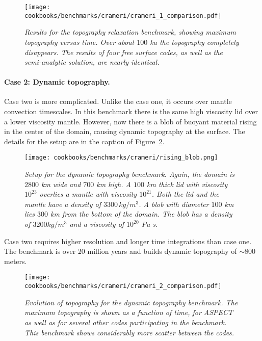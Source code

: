 \documentclass{article}
\newcommand{\aspect}{\textsc{ASPECT}}
\begin{document}
\begin{figure}
  \begin{center}
    \texttt{[image: cookbooks/benchmarks/crameri/crameri\_1\_comparison.pdf]}
  \end{center}
  \caption{\it Results for the topography relaxation benchmark, showing maximum topography 
   versus time. Over about $100$ ka the topography completely disappears. The results of four 
   free surface codes, as well as the semi-analytic solution, are nearly identical.}
  \label{fig:crameri-benchmark-relaxation-topography}
\end{figure}

\paragraph{Case 2: Dynamic topography.}
\label{sec:benchmark-crameri-case-2}

Case two is more complicated. Unlike the case one, it occurs over mantle convection 
timescales.  In this benchmark there is the same high viscosity lid over a lower 
viscosity mantle. However, now there is a blob of buoyant material rising in the 
center of the domain, causing dynamic topography at the surface. The details for the setup
are in the caption of Figure~\ref{fig:crameri-benchmark-rising-blob}.

\begin{figure}
  \begin{center}
    \texttt{[image: cookbooks/benchmarks/crameri/rising\_blob.png]}
  \end{center}
  \caption{\it Setup for the dynamic topography benchmark. Again, the domain is $2800$ km 
  wide and $700$ km high.  A $100$ km thick lid with viscosity $10^{23}$ overlies a mantle
  with viscosity $10^{21}$.  Both the lid and the mantle have a density of $3300\,kg/m^3$.
  A blob with diameter $100$ km lies $300$ km from the bottom of the domain.  The blob has 
  a density of $3200 kg/m^3$ and a viscosity of $10^{20}$ Pa s.}
  \label{fig:crameri-benchmark-rising-blob}
\end{figure}

Case two requires higher resolution and longer time integrations than case one. The benchmark
is over 20 million years and builds dynamic topography of $\sim 800$ meters.  

\begin{figure}
  \begin{center}
    \texttt{[image: cookbooks/benchmarks/crameri/crameri\_2\_comparison.pdf]}
  \end{center}
  \caption{\it Evolution of topography for the dynamic topography benchmark. The maximum topography
   is shown as a function of time, for \aspect{} as well as for several other codes participating in
   the benchmark. This benchmark shows considerably more scatter between the codes.}
  \label{fig:crameri-2-comparison}
\end{figure}
\end{document}
